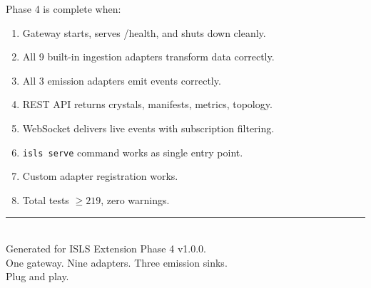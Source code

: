 \documentclass[11pt,a4paper,twoside]{article}
\theoremstyle{definition}
\theoremstyle{plain}
\theoremstyle{remark}
\newcommand{\ISLS}{\textsf{ISLS}}
\begin{document}
Phase 4 is complete when:
\begin{enumerate}[nosep]
  \item Gateway starts, serves /health, and shuts down cleanly.
  \item All 9 built-in ingestion adapters transform data correctly.
  \item All 3 emission adapters emit events correctly.
  \item REST API returns crystals, manifests, metrics, topology.
  \item WebSocket delivers live events with subscription filtering.
  \item \texttt{isls serve} command works as single entry point.
  \item Custom adapter registration works.
  \item Total tests $\ge 219$, zero warnings.
\end{enumerate}


\vfill
\begin{center}
\rule{0.5\textwidth}{0.4pt}\\[0.5cm]
{\small Generated for \ISLS{} Extension Phase 4 v1.0.0.\\
One gateway. Nine adapters. Three emission sinks.\\
Plug and play.}
\end{center}
\end{document}

